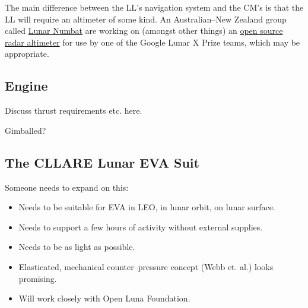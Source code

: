 \documentclass{report}
\begin{document}
The main difference between the LL's navigation system and the CM's is that the LL will require an altimeter of some kind.  An Australian--New Zealand group called \href{http://www.lunarnumbat.org}{Lunar Numbat} are working on (amongst other things) an \href{http://www.lunarnumbat.org/cgi-bin/twiki/view/LunarNumbat/LNTaskRadarAltimeter}{open source radar altimeter} for use by one of the Google Lunar X Prize teams, which may be appropriate.

\subsection{Engine}

Discuss thrust requirements etc. here.

Gimballed?

\subsection{The CLLARE Lunar EVA Suit}

Someone needs to expand on this:
\begin{itemize}
\item Needs to be suitable for EVA in LEO, in lunar orbit, on lunar surface.
\item Needs to support a few hours of activity without external supplies.
\item Needs to be as light as possible.
\item Elasticated, mechanical counter--pressure concept (Webb et. al.) looks promising.
\item Will work closely with Open Luna Foundation.
\end{itemize}
\end{document}
